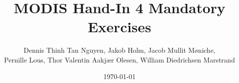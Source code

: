 \documentclass{article}
\author{Dennis Thinh Tan Nguyen, Jakob Holm, Jacob Mullit Møniche,\\
		Pernille Lous, Thor Valentin Aakjær Olesen, William Diedrichsen Marstrand}
\date{\today}
\title{MODIS Hand-In 4 Mandatory Exercises}
\begin{document}
	\maketitle
	\pagebreak
	
	
	
	
	
	
	
	
	
	
	
	
	
\end{document}
